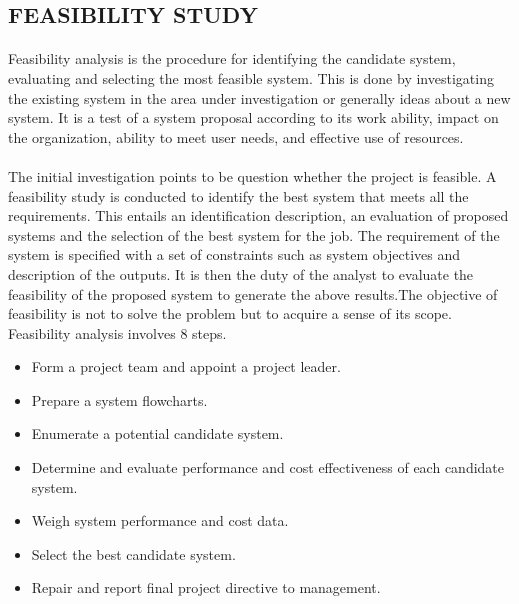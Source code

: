 \documentclass[a4paper, 12pt]{report}
\begin{document}
\subsection{FEASIBILITY STUDY}
\paragraph{}Feasibility analysis is the procedure for identifying the candidate system, evaluating
and selecting the most feasible system. This is done by investigating the existing system in
the area under investigation or generally ideas about a new system. It is a test of a system
proposal according to its work ability, impact on the organization, ability to meet user needs,
and effective use of resources.\paragraph{}The initial investigation points to be question whether the project is feasible. A
feasibility study is conducted to identify the best system that meets all the requirements. This
entails an identification description, an evaluation of proposed systems and the selection of
the best system for the job. The requirement of the system is specified with a set of
constraints such as system objectives and description of the outputs. It is then the duty of the
analyst to evaluate the feasibility of the proposed system to generate the above results.The
objective of feasibility is not to solve the problem but to acquire a sense of its scope.
Feasibility analysis involves 8 steps.
\begin{itemize}
\item Form a project team and appoint a project leader.
\item Prepare a system flowcharts.
\item Enumerate a potential candidate system.
\item Determine and evaluate performance and cost effectiveness of each candidate system.
\item Weigh system performance and cost data.
\item Select the best candidate system.
\item Repair and report final project directive to management.
\end{itemize}
\end{document}

